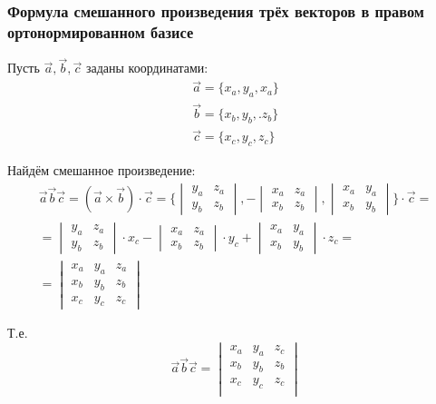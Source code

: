 \subsubsection{Формула смешанного произведения трёх векторов в правом ортонормированном базисе}

Пусть $\vec{a}, \vec{b}, \vec{c}$ заданы координатами:
\begin{gather*}
  \vec{a} = \{x_a, y_a, x_a\} \\
  \vec{b} = \{x_b, y_b,. z_b\} \\
  \vec{c} = \{x_c, y_c, z_c\} 
\end{gather*}

Найдём смешанное произведение:
\begin{gather*}
  \vec{a} \vec{b} \vec{c} = (\vec{a} \times \vec{b}) \cdot \vec{c} = \{
    \begin{vmatrix}
      y_a & z_a \\
      y_b & z_b 
    \end{vmatrix},
    - \begin{vmatrix}
      x_a & z_a \\
      x_b & z_b 
    \end{vmatrix},
    \begin{vmatrix}
      x_a & y_a \\
      x_b & y_b
    \end{vmatrix}
  \} \cdot \vec{c} = \\
    = \begin{vmatrix}
      y_a & z_a \\
      y_b & z_b 
    \end{vmatrix} \cdot x_c
    - \begin{vmatrix}
      x_a & z_a \\
      x_b & z_b 
    \end{vmatrix} \cdot y_c
    + \begin{vmatrix}
      x_a & y_a \\
      x_b & y_b
    \end{vmatrix} \cdot z_c = \\
    =
    \begin{vmatrix}
      x_a & y_a & z_a \\
      x_b & y_b & z_b \\
      x_c & y_c & z_c 
    \end{vmatrix}
\end{gather*}

Т.е. \[
\vec{a} \vec{b} \vec{c} =
\begin{vmatrix}
  x_a & y_a & z_c \\
  x_b & y_b & z_b \\
  x_c & y_c & z_c \\
\end{vmatrix}
\]
